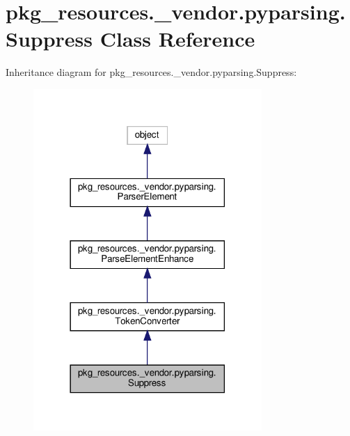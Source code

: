 \hypertarget{classpkg__resources_1_1__vendor_1_1pyparsing_1_1Suppress}{}\section{pkg\+\_\+resources.\+\_\+vendor.\+pyparsing.\+Suppress Class Reference}
\label{classpkg__resources_1_1__vendor_1_1pyparsing_1_1Suppress}


Inheritance diagram for pkg\+\_\+resources.\+\_\+vendor.\+pyparsing.\+Suppress\+:
\nopagebreak
\begin{figure}[H]
\begin{center}
\leavevmode
\includegraphics[width=246pt]{classpkg__resources_1_1__vendor_1_1pyparsing_1_1Suppress__inherit__graph}
\end{center}
\end{figure}


